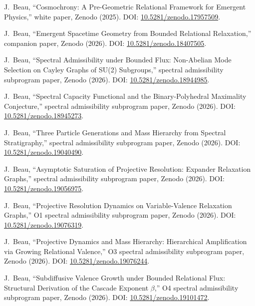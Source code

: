 J.~Beau,
``Cosmochrony: A Pre-Geometric Relational Framework for Emergent Physics,''
white paper, Zenodo (2025).
DOI: \href{https://doi.org/10.5281/zenodo.17957509}{10.5281/zenodo.17957509}.

J.~Beau,
``Emergent Spacetime Geometry from Bounded Relational Relaxation,''
companion paper, Zenodo (2026).
DOI: \href{https://doi.org/10.5281/zenodo.18407505}{10.5281/zenodo.18407505}.

J.~Beau,
``Spectral Admissibility under Bounded Flux: Non-Abelian Mode Selection on Cayley Graphs of SU(2) Subgroups,''
spectral admissibility subprogram paper, Zenodo (2026).
DOI: \href{https://doi.org/10.5281/zenodo.18944985}{10.5281/zenodo.18944985}.

J.~Beau,
``Spectral Capacity Functional and the Binary-Polyhedral Maximality Conjecture,''
spectral admissibility subprogram paper, Zenodo (2026).
DOI: \href{https://doi.org/10.5281/zenodo.18945273}{10.5281/zenodo.18945273}.

J.~Beau,
``Three Particle Generations and Mass Hierarchy from Spectral Stratigraphy,''
spectral admissibility subprogram paper, Zenodo (2026).
DOI: \href{https://doi.org/10.5281/zenodo.19040490}{10.5281/zenodo.19040490}.

J.~Beau,
``Asymptotic Saturation of Projective Resolution: Expander Relaxation Graphs,''
spectral admissibility subprogram paper, Zenodo (2026).
DOI: \href{https://doi.org/10.5281/zenodo.19056975}{10.5281/zenodo.19056975}.

J.~Beau,
``Projective Resolution Dynamics on Variable-Valence Relaxation Graphs,''
O1 spectral admissibility subprogram paper, Zenodo (2026).
DOI: \href{https://doi.org/10.5281/zenodo.19076319}{10.5281/zenodo.19076319}.

J.~Beau,
``Projective Dynamics and Mass Hierarchy: Hierarchical Amplification via Growing Relational Valence,''
O3 spectral admissibility subprogram paper, Zenodo (2026).
DOI: \href{https://doi.org/10.5281/zenodo.19076244}{10.5281/zenodo.19076244}.

J.~Beau,
``Subdiffusive Valence Growth under Bounded Relational Flux: Structural Derivation of the Cascade Exponent $\beta$,''
O4 spectral admissibility subprogram paper, Zenodo (2026).
DOI: \href{https://doi.org/10.5281/zenodo.19101472}{10.5281/zenodo.19101472}.


